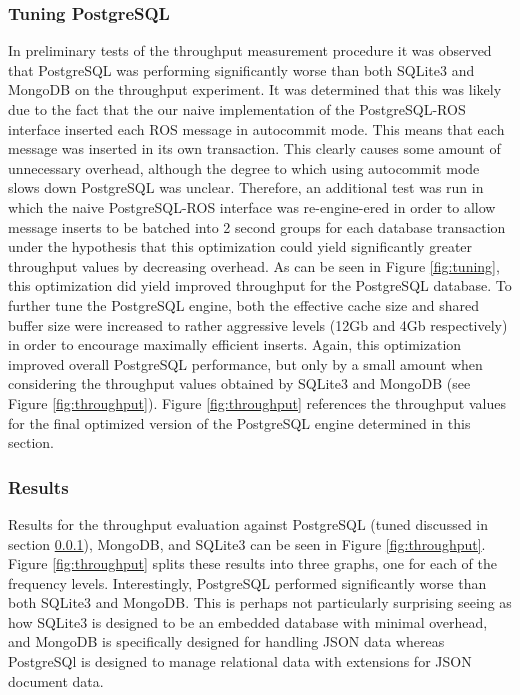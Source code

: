 \documentclass[nocopyrightspace]{acm_proc_article-sp}
\begin{document}
\subsubsection{Tuning PostgreSQL}
\label{sec:tuning}
In preliminary tests of the throughput measurement procedure it was observed that PostgreSQL was performing significantly worse than both SQLite3 and MongoDB on the throughput experiment. It was determined that this was likely due to the fact that the our naive implementation of the PostgreSQL-ROS interface inserted each ROS message in autocommit mode. This means that each message was inserted in its own transaction. This clearly causes some amount of unnecessary overhead, although the degree to which using autocommit mode slows down PostgreSQL was unclear. Therefore, an additional test was run in which the naive PostgreSQL-ROS interface was re-engine-ered in order to allow message inserts to be batched into 2 second groups for each database transaction under the hypothesis that this optimization could yield significantly greater throughput values by decreasing overhead. As can be seen in Figure \ref{fig:tuning}, this optimization did yield improved throughput for the PostgreSQL database. To further tune the PostgreSQL engine, both the effective cache size and shared buffer size were increased to rather aggressive levels (12Gb and 4Gb respectively) in order to encourage maximally efficient inserts. Again, this optimization improved overall PostgreSQL performance, but only by a small amount when considering the throughput values obtained by SQLite3 and MongoDB (see Figure \ref{fig:throughput}). Figure \ref{fig:throughput} references the throughput values for the final optimized version of the PostgreSQL engine determined in this section.


\subsubsection{Results}
Results for the throughput evaluation against PostgreSQL (tuned discussed in section \ref{sec:tuning}), MongoDB, and SQLite3 can be seen in Figure \ref{fig:throughput}. Figure \ref{fig:throughput} splits these results into three graphs, one for each of the frequency levels. Interestingly, PostgreSQL performed significantly worse than both SQLite3 and MongoDB. This is perhaps not particularly surprising seeing as how SQLite3 is designed to be an embedded database with minimal overhead, and MongoDB is specifically designed for handling JSON data whereas PostgreSQl is designed to manage relational data with extensions for JSON document data.
\end{document}
